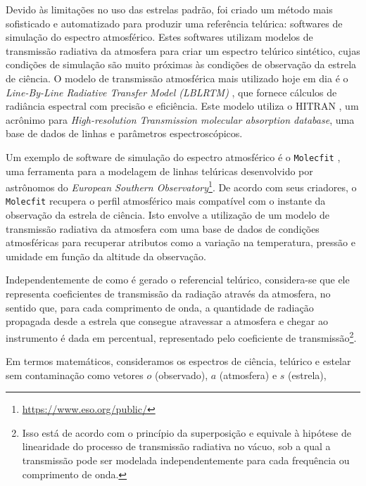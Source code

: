 Devido às limitações no uso das estrelas padrão, foi criado um método mais sofisticado e automatizado para produzir uma referência telúrica: softwares de simulação do espectro atmosférico. Estes softwares utilizam modelos de transmissão radiativa da atmosfera para criar um espectro telúrico sintético, cujas condições de simulação são muito próximas às condições de observação da estrela de ciência. O modelo de transmissão atmosférica mais utilizado hoje em dia é o \textit{Line-By-Line Radiative Transfer Model (LBLRTM)} \citep{2005JQSRT..91..233C}, que fornece cálculos de radiância espectral com precisão e eficiência. Este modelo utiliza o HITRAN \citep{rothman2009hitran}, um acrônimo para \textit{High-resolution Transmission molecular absorption database}, uma base de dados de linhas e parâmetros espectroscópicos. 

Um exemplo de software de simulação do espectro atmosférico é o \texttt{Molecfit} \citep{smette2015molecfit}, uma ferramenta para a modelagem de linhas telúricas desenvolvido por astrônomos do \textit{European Southern Observatory}\footnote{\url{https://www.eso.org/public/}}. De acordo com seus criadores, o \texttt{Molecfit} recupera o perfil atmosférico mais compatível com o instante da observação da estrela de ciência. Isto envolve a utilização de um modelo de transmissão radiativa da atmosfera com uma base de dados de condições atmosféricas para recuperar atributos como a variação na temperatura, pressão e umidade em função da altitude da observação.

Independentemente de como é gerado o referencial telúrico, considera-se que ele representa coeficientes de transmissão da radiação através da atmosfera, no sentido que, para cada comprimento de onda, a quantidade de radiação propagada desde a estrela que consegue atravessar a atmosfera e chegar ao instrumento é dada em percentual, representado pelo coeficiente de transmissão\footnote{Isso está de acordo com o princípio da superposição e equivale à hipótese de linearidade do processo de transmissão radiativa no vácuo, sob a qual a transmissão pode ser modelada independentemente para cada frequência ou comprimento de onda.}. %

Em termos matemáticos, consideramos os espectros de ciência, telúrico e estelar sem contaminação como vetores $o$ (observado), $a$ (atmosfera) e $s$ (estrela),

